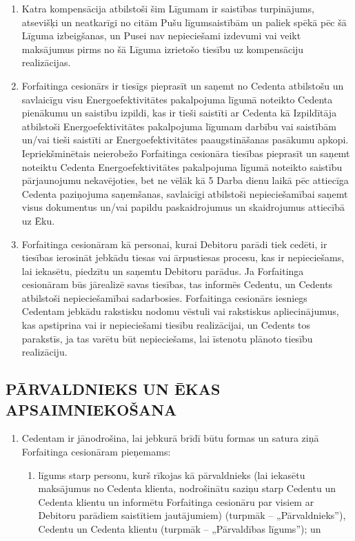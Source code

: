 \documentclass[a4paper]{article}
\begin{document}
\begin{multicols}{2}
\begin{enumerate}
  \item{Katra kompensācija atbilstoši šim Līgumam ir saistības turpinājums,
atsevišķi un neatkarīgi no citām Pušu līgumsaistībām un paliek spēkā
pēc šā Līguma izbeigšanas, un Pusei nav nepieciešami izdevumi vai veikt
maksājumus pirms no šā Līguma izrietošo tiesību uz kompensāciju
realizācijas.}

  \item{Forfaitinga cesionārs ir tiesīgs pieprasīt un saņemt no Cedenta
atbilstošu un savlaicīgu visu Energoefektivitātes pakalpojuma līgumā
noteikto Cedenta pienākumu un saistību izpildi, kas ir tieši saistīti ar
Cedenta kā Izpildītāja atbilstoši Energoefektivitātes pakalpojuma
līgumam darbību vai saistībām un/vai tieši saistīti ar
Energoefektivitātes paaugstināšanas pasākumu apkopi.
Iepriekšminētais neierobežo Forfaitinga cesionāra tiesības pieprasīt un
saņemt noteiktu Cedenta Energoefektivitātes pakalpojuma līgumā
noteikto saistību pārjaunojumu nekavējoties, bet ne vēlāk kā 5 Darba
dienu laikā pēc attiecīga Cedenta paziņojuma saņemšanas, savlaicīgi
atbilstoši nepieciešamībai saņemt visus dokumentus un/vai papildu
paskaidrojumus un skaidrojumus attiecībā uz Ēku.}

 \item{Forfaitinga cesionāram kā personai, kurai Debitoru parādi tiek cedēti, ir
tiesības ierosināt jebkādu tiesas vai ārpustiesas procesu, kas ir
nepieciešams, lai iekasētu, piedzītu un saņemtu Debitoru parādus. Ja
Forfaitinga cesionāram būs jārealizē savas tiesības, tas informēs
Cedentu, un Cedents atbilstoši nepieciešamībai sadarbosies.
Forfaitinga cesionārs iesniegs Cedentam jebkādu rakstisku nodomu
vēstuli vai rakstiskus apliecinājumus, kas apstiprina vai ir nepieciešami
tiesību realizācijai, un Cedents tos parakstīs, ja tas varētu būt
nepieciešams, lai īstenotu plānoto tiesību realizāciju.}
  \end{enumerate}

  \subsection{PĀRVALDNIEKS UN ĒKAS APSAIMNIEKOŠANA}

  \begin{enumerate}
  \item{Cedentam ir jānodrošina, lai jebkurā brīdī būtu formas un satura ziņā
Forfaitinga cesionāram pieņemams:}

    \begin{enumerate}
    \item{līgums starp personu, kurš rīkojas kā pārvaldnieks (lai
iekasētu maksājumus no Cedenta klienta, nodrošinātu saziņu starp
Cedentu un Cedenta klientu un informētu Forfaitinga cesionāru par
visiem ar Debitoru parādiem saistītiem jautājumiem) (turpmāk –
„Pārvaldnieks”), Cedentu un Cedenta klientu (turpmāk – „Pārvaldības
līgums”); un}


\end{enumerate}
\end{enumerate}
\end{multicols}
\end{document}
